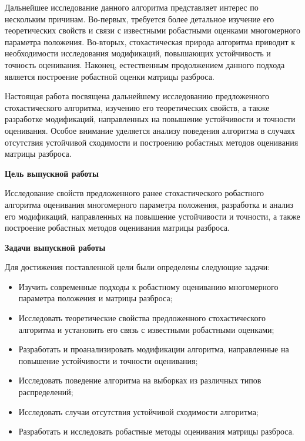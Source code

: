 Дальнейшее исследование данного алгоритма представляет интерес по нес\-кольким причинам. Во-первых, требуется более детальное изучение его теоретических свойств и связи с известными робастными оценками многомерного параметра положения. Во-вторых, стохастическая природа алгоритма приводит к необходимости исследования модификаций, повышающих устойчивость и точность оценивания. Наконец, естественным продолжением данного подхода является построение робастной оценки матрицы разброса.

Настоящая работа посвящена дальнейшему исследованию предложенного стохастического алгоритма, изучению его теоретических свойств, а также разработке модификаций, направленных на повышение устойчивости и точности оценивания. Особое внимание уделяется анализу поведения алгоритма в случаях отсутствия устойчивой сходимости и построению робастных методов оценивания матрицы разброса.

\vspace{1.7ex}

\textbf{Цель выпускной работы}

Исследование свойств предложенного ранее стохастического робастного алгоритма оценивания многомерного параметра положения, разработка и анализ его модификаций, направленных на повышение устойчивости и точности, а также построение робастных методов оценивания матрицы разброса.

\vspace{2.2ex}

\textbf{Задачи выпускной работы}

Для достижения поставленной цели были определены следующие задачи:
\begin{itemize}
    \item Изучить современные подходы к робастному оцениванию многомерного параметра положения и матрицы разброса;
    
    \item Исследовать теоретические свойства предложенного стохастического алгоритма и установить его связь с известными робастными оценками;
    
    \item Разработать и проанализировать модификации алгоритма, направленные на повышение устойчивости и точности оценивания;
    
    \item Исследовать поведение алгоритма на выборках из различных типов распределений;
    
    \item Исследовать случаи отсутствия устойчивой сходимости алгоритма;
    
    \item Разработать и исследовать робастные методы оценивания матрицы разброса.
\end{itemize}